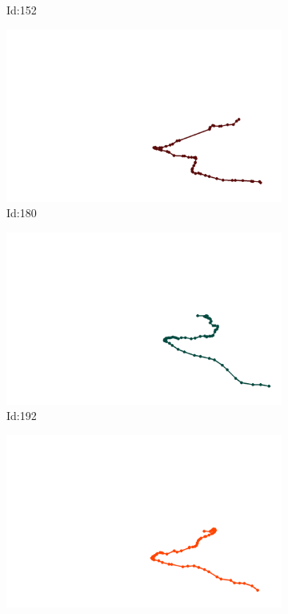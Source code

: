 \documentclass[12pt,twoside]{report}
\begin{document}
\begin{figure}
\begin{subfigure}[b]{0.20\textwidth}
\caption{Id:152}
\end{subfigure}
\begin{subfigure}[b]{0.20\textwidth}
\centering
\includegraphics[width=\textwidth]{../trajectories/180.png}
\caption{Id:180}
\end{subfigure}
\begin{subfigure}[b]{0.20\textwidth}
\centering
\includegraphics[width=\textwidth]{../trajectories/192.png}
\caption{Id:192}
\end{subfigure}
\begin{subfigure}[b]{0.20\textwidth}
\centering
\includegraphics[width=\textwidth]{../trajectories/314.png}

\end{subfigure}
\end{figure}
\end{document}
